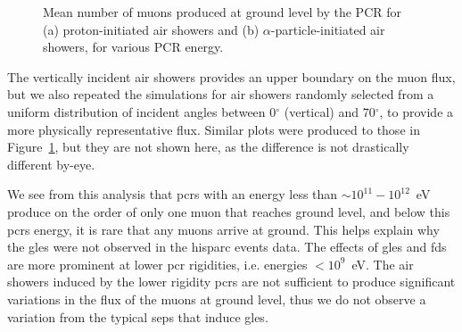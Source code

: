 \begin{figure}[ht!]
	\centering
	\qquad
	\caption{Mean number of muons produced at ground level by the PCR for (a) proton-initiated air showers and (b) $\alpha$-particle-initiated air showers, for various PCR energy.}
	\label{fig:shower_muons}
\end{figure}

The vertically incident air showers provides an upper boundary on the muon flux, but we also repeated the simulations for air showers randomly selected from a uniform distribution of incident angles between 0$^\circ$ (vertical) and 70$^\circ$, to provide a more physically representative flux. Similar plots were produced to those in Figure~\ref{fig:shower_muons}, but they are not shown here, as the difference is not drastically different by-eye. 

We see from this analysis that \glspl{pcr} with an energy less than $\sim 10^{11}-10^{12}$~eV produce on the order of only one muon that reaches ground level, and below this \glspl{pcr} energy, it is rare that any muons arrive at ground. This helps explain why the \glspl{gle} were not observed in the \gls{hisparc} events data. The effects of \glspl{gle} and \glspl{fd} are more prominent at lower \gls{pcr} rigidities, i.e. energies $<10^9$~eV. The air showers induced by the lower rigidity \glspl{pcr} are not sufficient to produce significant variations in the flux of the muons at ground level, thus we do not observe a variation from the typical \glspl{sep} that induce \glspl{gle}.

